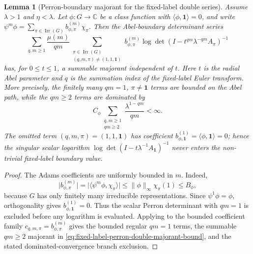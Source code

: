\documentclass[11pt,a4paper]{amsart}
\theoremstyle{plain}
\newtheorem{lemma}[theorem]{Lemma}
\theoremstyle{definition}
\theoremstyle{remark}
\DeclareMathOperator{\Irr}{Irr}
\newcommand{\CC}{\mathbb{C}}
\newcommand{\abs}[1]{\lvert #1 \rvert}
\newcommand{\norm}[1]{\lVert #1 \rVert}
\begin{document}
\begin{lemma}[Perron-boundary majorant for the fixed-label double series]
  \label{lem:fixed-label-perron-double-majorant}
  Assume \(\lambda>1\) and \(\eta<\lambda\). Let
  \(\phi:G\to\CC\) be a class function with
  \(\langle\phi,\mathbf1\rangle=0\), and write
  \(\psi^m\phi=\sum_{\pi\in\Irr(G)}b_{\phi,\pi}^{(m)}\chi_\pi\).
  Then the Abel-boundary determinant series
  \begin{equation}\label{eq:fixed-label-perron-double-majorant-series}
    \sum_{q,m\ge1}\frac{\mu(m)}{qm}
      \sum_{\substack{\pi\in\Irr(G)\\(q,m,\pi)\neq(1,1,\mathbf1)}}
        b_{\phi,\pi}^{(m)}
        \log\det(I-t^{qm}\lambda^{-qm}A_\pi)^{-1}
  \end{equation}
  has, for \(0\le t\le1\), a summable majorant independent of \(t\).
  Here \(t\) is the radial Abel parameter and \(q\) is the summation index
  of the fixed-label Euler transform. More precisely, the finitely many
  \(qm=1\), \(\pi\neq\mathbf1\) terms are bounded on the Abel path, while
  the \(qm\ge2\) terms are dominated by
  \begin{equation}\label{eq:fixed-label-perron-double-majorant-bound}
    C_\phi
    \sum_{\substack{q,m\ge1\\qm\ge2}}\frac{\lambda^{1-qm}}{qm}<\infty .
  \end{equation}
  The omitted term \((q,m,\pi)=(1,1,\mathbf1)\) has coefficient
  \(b_{\phi,\mathbf1}^{(1)}=\langle\phi,\mathbf1\rangle=0\); hence the
  singular scalar logarithm
  \(\log\det(I-t\lambda^{-1}A_{\mathbf1})^{-1}\) never enters the
  non-trivial fixed-label boundary value.
\end{lemma}

\begin{proof}
  The Adams coefficients are uniformly bounded in \(m\). Indeed,
  \[
    \abs{b_{\phi,\pi}^{(m)}}
    =\abs{\langle\psi^m\phi,\chi_\pi\rangle}
    \le \norm{\phi}_\infty\chi_\pi(1)
    \le B_\phi,
  \]
  because \(G\) has only finitely many irreducible representations. Since
  \(\psi^1\phi=\phi\), orthogonality gives
  \(b_{\phi,\mathbf1}^{(1)}=0\). Thus the scalar Perron determinant with
  \(qm=1\) is excluded before any logarithm is evaluated. Applying
   to the bounded
  coefficient family \(c_{q,m,
  \pi}=b_{\phi,\pi}^{(m)}\) gives the bounded regular \(qm=1\) terms, the
  summable \(qm\ge2\) majorant in
  \eqref{eq:fixed-label-perron-double-majorant-bound}, and the stated
  dominated-convergence branch exclusion.
\end{proof}
\end{document}

